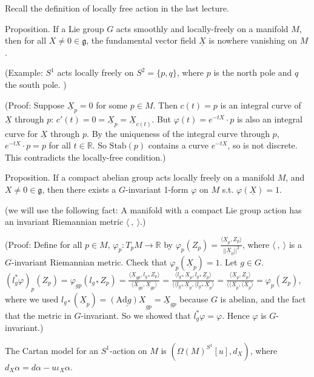 \documentclass{article}
\theoremstyle{mystyle}
\theoremstyle{remark}
\numberwithin{equation}{section}
\begin{document}
Recall the definition of locally free action in the last lecture.

Proposition. If a Lie group $G$ acts smoothly and locally-freely on a manifold $M$, then for all $X\neq 0\in \mathfrak{g}$, the fundamental vector field $\underline{X}$ is nowhere vanishing on $M$.

(Example: $S^1$ acts locally freely on $S^2=\{p,q\}$, where $p$ is the north pole and $q$ the south pole. )

(Proof: Suppose $\underline{X}_p=0$ for some $p\in M$. Then $c(t) = p$ is an integral curve of $\underline{X}$ through $p$: $c'(t) = 0 = \underline{X}_p = \underline{X}_{c(t)}$. But $\varphi(t) = e^{-tX}\cdot p$ is also an integral curve for $\underline{X}$ through $p$. By the uniqueness of the integral curve through $p$, $e^{-tX}\cdot p = p$ for all $t \in \mathbb{R}$. So $\mathrm{Stab}(p)$ contains a curve $e^{-tX}$, so is not discrete. This contradicts the locally-free condition.)

Proposition. If a compact abelian group acts locally freely on a manifold $M$, and $X\neq 0\in \mathfrak{g}$, then there exists a $G$-invariant 1-form $\varphi$ on $M$ s.t. $\varphi(\underline{X}) = 1$. 



(we will use the following fact: A manifold with a compact Lie group action has an invariant Riemannian metric $\langle~,~\rangle$.)


(Proof: Define for all $p\in M$, $\varphi_p\colon T_pM\rightarrow \mathbb{R}$ by $\varphi_p(Z_p) = \frac{\langle \underline{X}_p,Z_p\rangle}{||\underline{X}_0||^2}$, where $\langle~,~\rangle$ is a $G$-invariant Riemannian metric. Check that $\varphi_p(\underline{X}_p) = 1$. Let $g\in G$. $(l^*_g\varphi)_p(Z_p) = \varphi_{gp}(l_{g*}Z_p) = \frac{\langle \underline{X}_{gp},l_{g*}Z_p\rangle} {\langle \underline{X}_{gp},\underline{X}_{gp}\rangle}
 = \frac{\langle l_{g*}\underline{X}_p, l_{g*}\underline{Z}_p\rangle }{\langle \langle l_{g*}\underline{X}_p,\langle l_{g*}\underline{X}_p\rangle} =\frac{\langle \underline{X}_p, \underline{Z}_p\rangle }{\langle \langle \underline{X}_p,\langle \underline{X}_p\rangle} = \varphi_p(Z_p)$, where we used $l_{g*}(\underline{X}_p) = \underline{(\mathrm{Ad}g)X}_{gp} = \underline{X}_{gp}$ because $G$ is abelian, and the fact that the metric in $G$-invariant. So we showed that $l_g^*\varphi = \varphi$. Hence $\varphi$ is $G$-invariant.)
 
 
 
The Cartan model for an $S^1$-action on $M$ is $(\Omega(M)^{S^1}[u],d_X)$, where $d_X\alpha = d\alpha -u\iota_X\alpha$.
\end{document}
